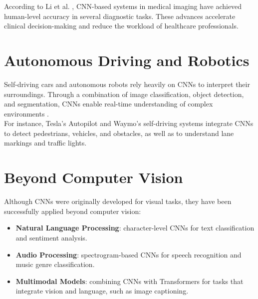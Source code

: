 According to Li et al. \cite{li2021survey}, CNN-based systems in medical imaging have achieved human-level accuracy in several diagnostic tasks. 
These advances accelerate clinical decision-making and reduce the workload of healthcare professionals.

\section{Autonomous Driving and Robotics}

Self-driving cars and autonomous robots rely heavily on CNNs to interpret their surroundings. 
Through a combination of image classification, object detection, and segmentation, CNNs enable real-time understanding of complex environments \cite{zhao2024review}. 
\\
For instance, Tesla’s Autopilot and Waymo’s self-driving systems integrate CNNs to detect pedestrians, vehicles, and obstacles, as well as to understand lane markings and traffic lights.

\section{Beyond Computer Vision}

Although CNNs were originally developed for visual tasks, they have been successfully applied beyond computer vision:

\begin{itemize}
    \item \textbf{Natural Language Processing}: character-level CNNs for text classification and sentiment analysis.
    \item \textbf{Audio Processing}: spectrogram-based CNNs for speech recognition and music genre classification.
    \item \textbf{Multimodal Models}: combining CNNs with Transformers for tasks that integrate vision and language, such as image captioning.
\end{itemize}